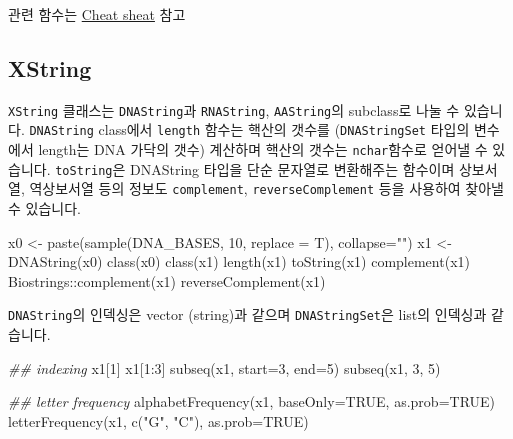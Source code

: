\documentclass[
  a4paper,
]{book}
\newenvironment{Shaded}{\begin{snugshade}}{\end{snugshade}}
\newcommand{\AttributeTok}[1]{\textcolor[rgb]{0.40,0.45,0.13}{#1}}
\newcommand{\ConstantTok}[1]{\textcolor[rgb]{0.56,0.35,0.01}{#1}}
\newcommand{\DecValTok}[1]{\textcolor[rgb]{0.68,0.00,0.00}{#1}}
\newcommand{\DocumentationTok}[1]{\textcolor[rgb]{0.37,0.37,0.37}{\textit{#1}}}
\newcommand{\FunctionTok}[1]{\textcolor[rgb]{0.28,0.35,0.67}{#1}}
\newcommand{\NormalTok}[1]{\textcolor[rgb]{0.00,0.23,0.31}{#1}}
\newcommand{\OtherTok}[1]{\textcolor[rgb]{0.00,0.23,0.31}{#1}}
\newcommand{\SpecialCharTok}[1]{\textcolor[rgb]{0.37,0.37,0.37}{#1}}
\newcommand{\StringTok}[1]{\textcolor[rgb]{0.13,0.47,0.30}{#1}}
\begin{document}
관련 함수는
\href{http://bioconductor.org/packages/release/bioc/vignettes/Biostrings/inst/doc/BiostringsQuickOverview.pdf}{Cheat
sheat} 참고

\hypertarget{xstring}{%
\subsection{XString}\label{xstring}}

\texttt{XString} 클래스는 \texttt{DNAString}과 \texttt{RNAString},
\texttt{AAString}의 subclass로 나눌 수 있습니다. \texttt{DNAString}
class에서 \texttt{length} 함수는 핵산의 갯수를 (\texttt{DNAStringSet}
타입의 변수에서 length는 DNA 가닥의 갯수) 계산하며 핵산의 갯수는
\texttt{nchar}함수로 얻어낼 수 있습니다. \texttt{toString}은 DNAString
타입을 단순 문자열로 변환해주는 함수이며 상보서열, 역상보서열 등의
정보도 \texttt{complement}, \texttt{reverseComplement} 등을 사용하여
찾아낼 수 있습니다.

\begin{Shaded}
\begin{Highlighting}[]
\NormalTok{x0 }\OtherTok{\textless{}{-}} \FunctionTok{paste}\NormalTok{(}\FunctionTok{sample}\NormalTok{(DNA\_BASES, }\DecValTok{10}\NormalTok{, }\AttributeTok{replace =}\NormalTok{ T), }\AttributeTok{collapse=}\StringTok{""}\NormalTok{)}
\NormalTok{x1 }\OtherTok{\textless{}{-}} \FunctionTok{DNAString}\NormalTok{(x0)}
\FunctionTok{class}\NormalTok{(x0)}
\FunctionTok{class}\NormalTok{(x1)}
\FunctionTok{length}\NormalTok{(x1)}
\FunctionTok{toString}\NormalTok{(x1)}
\FunctionTok{complement}\NormalTok{(x1)}
\NormalTok{Biostrings}\SpecialCharTok{::}\FunctionTok{complement}\NormalTok{(x1)}
\FunctionTok{reverseComplement}\NormalTok{(x1)}
\end{Highlighting}
\end{Shaded}

\texttt{DNAString}의 인덱싱은 vector (string)과 같으며
\texttt{DNAStringSet}은 list의 인덱싱과 같습니다.

\begin{Shaded}
\begin{Highlighting}[]
\DocumentationTok{\#\# indexing}
\NormalTok{x1[}\DecValTok{1}\NormalTok{]}
\NormalTok{x1[}\DecValTok{1}\SpecialCharTok{:}\DecValTok{3}\NormalTok{]}
\FunctionTok{subseq}\NormalTok{(x1, }\AttributeTok{start=}\DecValTok{3}\NormalTok{, }\AttributeTok{end=}\DecValTok{5}\NormalTok{)}
\FunctionTok{subseq}\NormalTok{(x1, }\DecValTok{3}\NormalTok{, }\DecValTok{5}\NormalTok{)}

\DocumentationTok{\#\# letter frequency}
\FunctionTok{alphabetFrequency}\NormalTok{(x1, }\AttributeTok{baseOnly=}\ConstantTok{TRUE}\NormalTok{, }\AttributeTok{as.prob=}\ConstantTok{TRUE}\NormalTok{)}
\FunctionTok{letterFrequency}\NormalTok{(x1, }\FunctionTok{c}\NormalTok{(}\StringTok{"G"}\NormalTok{, }\StringTok{"C"}\NormalTok{), }\AttributeTok{as.prob=}\ConstantTok{TRUE}\NormalTok{)}
\end{Highlighting}
\end{Shaded}
\end{document}
